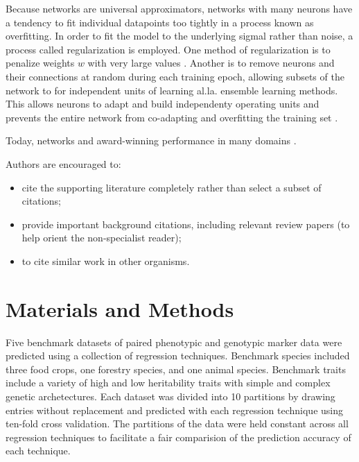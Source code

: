 \documentclass[9pt,twocolumn,twoside]{g3_article/gsag3jnl}
\begin{document}
Because networks are universal approximators, networks with many
neurons have a tendency to fit individual datapoints too tightly 
in a process known as overfitting. In order to fit the model to the underlying
sigmal rather than noise, a process called regularization is employed. One method
of regularization is to penalize weights $w$ with very large values \citep{krogh1992}. 
Another is to remove neurons and their connections at random during each training
epoch, allowing subsets of the network to for independent units of learning al.la. ensemble learning methods.  
This allows neurons to adapt and build independenty operating units and prevents the entire
network from co-adapting and overfitting the training set \citep{srivastava2014}.

Today, networks and award-winning performance in many domains \citep{schmidhuber2015}.


Authors are encouraged to:

\begin{itemize}
\item cite the supporting literature completely rather than select a subset of citations;
\item provide important background citations, including relevant review papers (to help orient the non-specialist reader);
\item to cite similar work in other organisms.
\end{itemize}

\section*{Materials and Methods}

Five benchmark datasets of paired phenotypic and genotypic marker data were predicted 
using a collection of regression techniques. Benchmark species included three food crops, 
one forestry species, and one animal species. Benchmark traits include a variety of high and low
heritability traits with simple and complex genetic archetectures. Each dataset was divided
into 10 partitions by drawing entries without replacement and predicted with each
regression technique using ten-fold cross validation. The partitions of the data were 
held constant across all regression techniques to facilitate a fair comparision of the
prediction accuracy of each technique.
\end{document}
